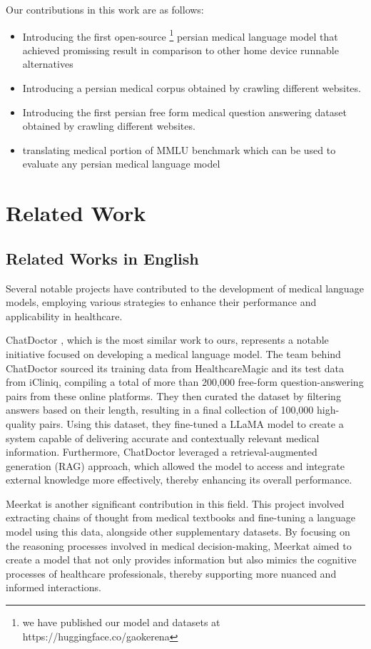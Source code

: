 \documentclass[conference]{IEEEtran}
\begin{document}
	
	Our contributions in this work are as follows:
	\begin{itemize}
		\item Introducing the first open-source
		\footnote{
			we have published our model and datasets at https://huggingface.co/gaokerena
		}
		persian medical language model that achieved promissing result in
		comparison to other home device runnable alternatives
		\item Introducing a persian medical corpus obtained by crawling different websites.
		\item  Introducing the first persian free form medical question answering dataset obtained by crawling different websites.
		\item translating medical portion of MMLU benchmark which can be used to evaluate any persian medical language model
	\end{itemize}
	
	\section{Related Work}
	
	\subsection{Related Works in English}
	Several notable projects have contributed to the development of medical language models, employing various strategies to enhance their performance and applicability in healthcare.
	
	ChatDoctor
	\cite{b7}, which is the most similar work to ours, represents a notable initiative focused on developing a medical language model. The team behind ChatDoctor sourced its training data from HealthcareMagic and its test data from iCliniq, compiling a total of more than 200,000 free-form question-answering pairs from these online platforms. They then curated the dataset by filtering answers based on their length, resulting in a final collection of 100,000 high-quality pairs. Using this dataset, they fine-tuned a LLaMA model \cite{b8} to create a system capable of delivering accurate and contextually relevant medical information. Furthermore, ChatDoctor leveraged a retrieval-augmented generation (RAG) approach, which allowed the model to access and integrate external knowledge more effectively, thereby enhancing its overall performance.
	
	Meerkat
	\cite{b9}
	is another significant contribution in this field. This project involved extracting chains of thought from medical textbooks and fine-tuning a language model using this data, alongside other supplementary datasets. By focusing on the reasoning processes involved in medical decision-making, Meerkat aimed to create a model that not only provides information but also mimics the cognitive processes of healthcare professionals, thereby supporting more nuanced and informed interactions.
	
\end{document}
